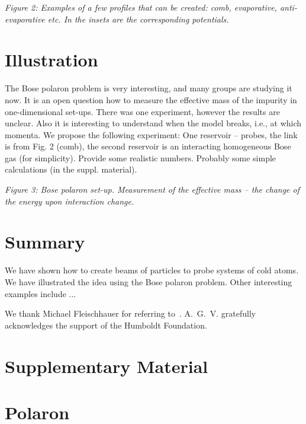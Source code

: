 \documentclass[twocolumn,amsmath,amssymb,showpacs,prl,superscriptaddress,aps]{revtex4-1}
\begin{document}
{\it Figure 2: Examples of a few profiles that can be created: comb, evaporative, anti-evaporative etc. In the insets are the corresponding potentials.}

\section{Illustration}

The Bose polaron problem is very interesting, and many groups are studying it now. It is an open question how to measure the effective mass of the impurity in one-dimensional set-ups. There was one experiment, however the results are unclear. Also it is interesting to understand when the model breaks, i.e., at which momenta. We propose the following experiment: One reservoir -- probes, the link is from Fig. 2 (comb), the second reservoir is an interacting homogeneous Bose gas (for simplicity). Provide some realistic numbers. Probably some simple calculations (in the suppl. material). 

{\it Figure 3: Bose polaron set-up. Measurement of the effective mass -- the change of the energy upon interaction change.}


\section{Summary} 

We have shown how to create beams of particles to probe systems of cold atoms. We have illustrated the idea using the Bose polaron problem. Other interesting examples include ... 

\begin{acknowledgments}
We thank Michael Fleischhauer for referring to~\cite{paper}.
A.~G.~V. gratefully acknowledges the support of the Humboldt Foundation.
\end{acknowledgments}

\widetext

\section{Supplementary Material}

\section{Polaron}
\end{document}
